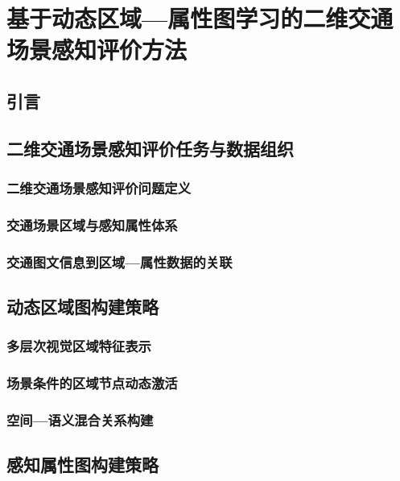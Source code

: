 
\chapter{基于动态区域—属性图学习的二维交通场景感知评价方法}

\section{引言}

\section{二维交通场景感知评价任务与数据组织}

\subsection{二维交通场景感知评价问题定义}

\subsection{交通场景区域与感知属性体系}

\subsection{交通图文信息到区域—属性数据的关联}

\section{动态区域图构建策略}

\subsection{多层次视觉区域特征表示}

\subsection{场景条件的区域节点动态激活}

\subsection{空间—语义混合关系构建}

\section{感知属性图构建策略}

